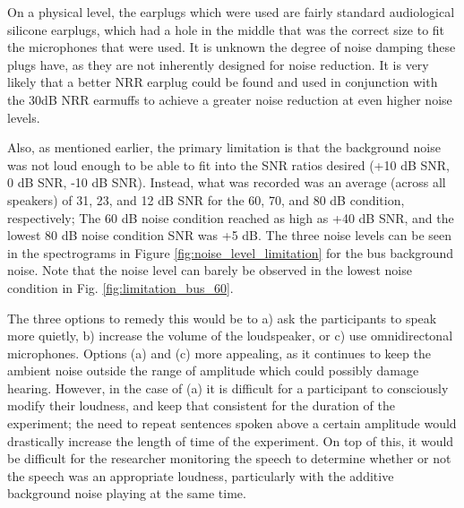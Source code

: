 \documentclass[dissertation,copyright]{uathesis}
\begin{document}
On a physical level, the earplugs which were used are fairly standard audiological silicone earplugs, which had a hole in the middle that was the correct size to fit the microphones that were used.  It is unknown the degree of noise damping these plugs have, as they are not inherently designed for noise reduction.  It is very likely that a better NRR earplug could be found and used in conjunction with the 30dB NRR earmuffs to achieve a greater noise reduction at even higher noise levels.

Also, as mentioned earlier, the primary limitation is that the background noise was not loud enough to be able to fit into the SNR ratios desired (+10 dB SNR, 0 dB SNR, -10 dB SNR).  Instead, what was recorded was an average (across all speakers) of 31, 23, and 12 dB SNR for the 60, 70, and 80 dB condition, respectively; The 60 dB noise condition reached as high as +40 dB SNR, and the lowest 80 dB noise condition SNR was +5 dB. The three noise levels can be seen in the spectrograms in Figure \ref{fig:noise_level_limitation} for the bus background noise.  Note that the noise level can barely be observed in the lowest noise condition in Fig. \ref{fig:limitation_bus_60}.

The three options to remedy this would be to a) ask the participants to speak more quietly, b) increase the volume of the loudspeaker, or c) use omnidirectonal microphones.  Options (a) and (c) more appealing, as it continues to keep the ambient noise outside the range of amplitude which could possibly damage hearing.  However, in the case of (a) it is difficult for a participant to consciously modify their loudness, and keep that consistent for the duration of the experiment; the need to repeat sentences spoken above a certain amplitude would drastically increase the length of time of the experiment.  On top of this, it would be difficult for the researcher monitoring the speech to determine whether or not the speech was an appropriate loudness, particularly with the additive background noise playing at the same time.  
\end{document}
